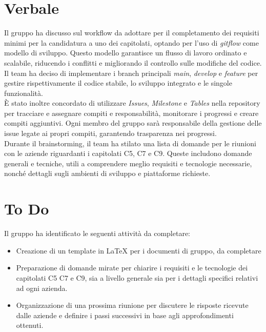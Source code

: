 \documentclass[a4paper, 12pt]{article}
\begin{document}
\section{Verbale}
Il gruppo ha discusso sul workflow da adottare per il completamento dei requisiti minimi per la candidatura a uno dei capitolati, optando per l’uso di \textit{gitflow} come modello di sviluppo. Questo modello garantisce un flusso di lavoro ordinato e scalabile, riducendo i conflitti e migliorando il controllo sulle modifiche del codice. Il team ha deciso di implementare i branch principali \textit{main}, \textit{develop} e \textit{feature} per gestire rispettivamente il codice stabile, lo sviluppo integrato e le singole funzionalità.
\\
È stato inoltre concordato di utilizzare \textit{Issues}, \textit{Milestone} e \textit{Tables} nella repository per tracciare e assegnare compiti e responsabilità, monitorare i progressi e creare compiti aggiuntivi. Ogni membro del gruppo sarà responsabile della gestione delle issue legate ai propri compiti, garantendo trasparenza nei progressi.
\\
Durante il brainstorming, il team ha stilato una lista di domande per le riunioni con le aziende riguardanti i capitolati C5, C7 e C9. Queste includono domande generali e tecniche, utili a comprendere meglio requisiti e tecnologie necessarie, nonché dettagli sugli ambienti di sviluppo e piattaforme richieste.

\section{To Do}
Il gruppo ha identificato le seguenti attività da completare:
\begin{itemize}
    \item Creazione di un template in \LaTeX{} per i documenti di gruppo, da completare
    \item Preparazione di domande mirate per chiarire i requisiti e le tecnologie dei capitolati C5 C7 e C9, sia a livello generale sia per i dettagli specifici relativi ad ogni azienda.
    \item Organizzazione di una prossima riunione per discutere le risposte ricevute dalle aziende e definire i passi successivi in base agli approfondimenti ottenuti.
\end{itemize}
\end{document}
